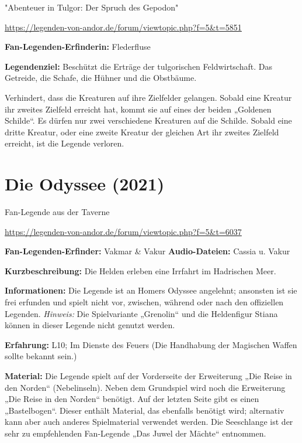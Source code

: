 {\begin{center}
    "Abenteuer in Tulgor: Der Spruch des Gepodon"

    \url{https://legenden-von-andor.de/forum/viewtopic.php?f=5&t=5851}
\end{center}


\textbf{Fan-Legenden-Erfinderin:} Flederfluse

\textbf{Legendenziel:} Beschützt die Erträge der tulgorischen Feldwirtschaft. Das Getreide, die Schafe, die Hühner und die Obstbäume.

Verhindert, dass die Kreaturen auf ihre Zielfelder gelangen. Sobald eine Kreatur ihr zweites Zielfeld erreicht hat, kommt sie auf eines der beiden „Goldenen Schilde“. Es dürfen nur zwei verschiedene Kreaturen auf die Schilde.
Sobald eine dritte Kreatur, oder eine zweite Kreatur der gleichen Art ihr zweites Zielfeld erreicht, ist die Legende verloren.




\newpage
\section{Die Odyssee (2021)}

\begin{center}
    Fan-Legende aus der Taverne

    \url{https://legenden-von-andor.de/forum/viewtopic.php?f=5&t=6037}
\end{center}



\textbf{Fan-Legenden-Erfinder:} Vakmar \& Vakur
\textbf{Audio-Dateien: }Cassia u. Vakur

\textbf{Kurzbeschreibung:} Die Helden erleben eine Irrfahrt im Hadrischen Meer.

\textbf{Informationen:} Die Legende ist an Homers Odyssee angelehnt; ansonsten ist sie frei erfunden und spielt nicht vor, zwischen, während oder nach den offiziellen Legenden.
\textit{Hinweis:} Die Spielvariante „Grenolin“ und die Heldenfigur Stiana können in dieser Legende nicht genutzt werden.

\textbf{Erfahrung:} L10; Im Dienste des Feuers (Die Handhabung der Magischen Waffen sollte bekannt sein.)

\textbf{Material:} Die Legende spielt auf der Vorderseite der Erweiterung „Die Reise in den Norden“ (Nebelinseln).
Neben dem Grundspiel wird noch die Erweiterung „Die Reise in den Norden“ benötigt.
Auf der letzten Seite gibt es einen „Bastelbogen“. Dieser enthält Material, das ebenfalls benötigt wird; alternativ kann aber auch anderes Spielmaterial verwendet werden.
Die Seeschlange ist der sehr zu empfehlenden Fan-Legende „Das Juwel der Mächte“ entnommen.

}
